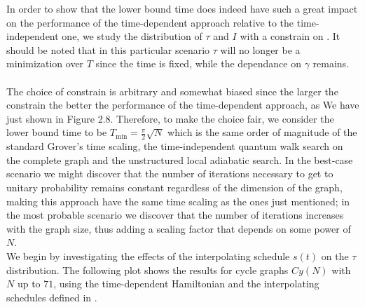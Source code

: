         \vspace{0.5cm}
        In order to show that the lower bound time does indeed have such a great impact on the performance of the time-dependent approach relative to the time-independent one, we study the distribution of $\tau$ and $I$ with a constrain on \tmin. It should be noted that in this particular scenario $\tau$ will no longer be a minimization over $T$ since the time is fixed, while the dependance on $\gamma$ remains. \\ \\ The choice of constrain is arbitrary and somewhat biased since the larger the constrain the better the performance of the time-dependent approach, as We have just shown in Figure 2.8. Therefore, to make the choice fair, we consider the lower bound time to be $T_{\min} = \frac{\pi}{2}\sqrt{N}$ which is the same order of magnitude of the standard Grover's time scaling, the time-independent quantum walk search on the complete graph and the unstructured local adiabatic search. In the best-case scenario we might discover that the number of iterations necessary to get to unitary probability remains constant regardless of the dimension of the graph, making this approach have the same time scaling as the ones just mentioned; in the most probable scenario we discover that the number of iterations increases with the graph size, thus adding a scaling factor that depends on some power of $N$. \\

        \noindent
        We begin by investigating the effects of the interpolating schedule $s(t)$ on the $\tau$ distribution. The following plot shows the results for cycle graphs $Cy(N)$ with $N$ up to $71$, using the time-dependent Hamiltonian and the interpolating schedules defined in .\\
        

